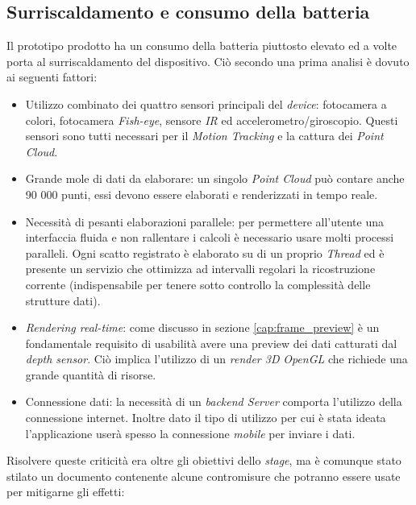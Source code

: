 \subsection{Surriscaldamento e consumo della batteria}
Il prototipo prodotto ha un consumo della batteria piuttosto elevato ed a volte porta al surriscaldamento del dispositivo.
Ciò secondo una prima analisi è dovuto ai seguenti fattori:
\begin{itemize}
	\item Utilizzo combinato dei quattro sensori principali del \emph{device}: fotocamera a colori, fotocamera \emph{Fish-eye}, sensore \emph{IR} ed accelerometro/giroscopio. Questi sensori sono tutti necessari per il \emph{Motion Tracking} e la cattura dei \emph{Point Cloud}.
	\item Grande mole di dati da elaborare: un singolo \emph{Point Cloud} può contare anche 90 000 punti, essi devono essere elaborati e renderizzati in tempo reale.	
	\item Necessità di pesanti elaborazioni parallele: per permettere all'utente una interfaccia fluida e non rallentare i calcoli è necessario usare molti processi paralleli. Ogni scatto registrato è elaborato su di un proprio \emph{Thread} ed è presente un servizio che ottimizza ad intervalli regolari la ricostruzione corrente (indispensabile per tenere sotto controllo la complessità delle strutture dati).
	\item \emph{Rendering real-time}: come discusso in sezione \ref{cap:frame_preview} è un fondamentale requisito di usabilità avere una preview dei dati catturati dal \emph{depth sensor}. Ciò implica l'utilizzo di un \emph{render 3D} \emph{OpenGL} che richiede una grande quantità di risorse.
	\item Connessione dati: la necessità di un \emph{backend Server} comporta l'utilizzo della connessione internet. Inoltre dato il tipo di utilizzo per cui è stata ideata l'applicazione userà spesso la connessione \emph{mobile} per inviare i dati.
\end{itemize}
Risolvere queste criticità era oltre gli obiettivi dello \emph{stage}, ma è comunque stato stilato un documento contenente alcune contromisure che potranno essere usate per mitigarne gli effetti:
